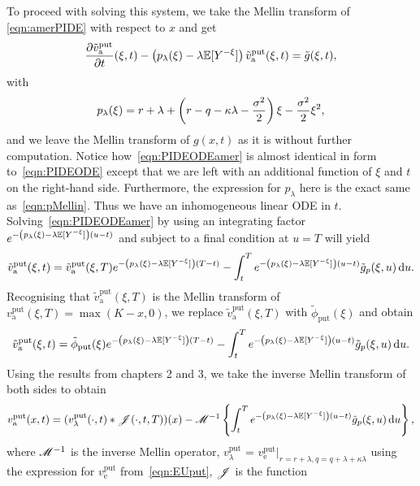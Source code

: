 To proceed with solving this system, we take the Mellin transform of \eqref{eqn:amerPIDE} with respect to $x$ and get
      \begin{equation}
      	  \label{eqn:PIDEODEamer}
        \frac{\partial \tilde{ v}_{\text{a}}^{\text{put}}}{\partial t}(\xi,t) - \left(p_\lambda(\xi) - \lambda\mathbb E[Y^{-\xi}]\right)\tilde{ v}_{\text{a}}^{\text{put}}(\xi,t) = \tilde{g}(\xi,t),
      \end{equation}
    with
      \begin{equation*}
        p_\lambda(\xi) = r + \lambda + \left(r - q -\kappa\lambda - \frac{\sigma^2}{2}\right)\xi - \frac{\sigma^2}{2}\xi^2,
      \end{equation*}
    and we leave the Mellin transform of $g(x,t)$ as it is without further computation. Notice how~\eqref{eqn:PIDEODEamer} is almost identical in form to~\eqref{eqn:PIDEODE} except that we are left with an additional function of $\xi$ and $t$ on the right-hand side. Furthermore, the expression for $p_\lambda$ here is the exact same as~\eqref{eqn:pMellin}. Thus we have an inhomogeneous linear ODE in $t$. Solving~\eqref{eqn:PIDEODEamer} by using an integrating factor $e^{-\left(p_\lambda(\xi) -\lambda\mathbb E[Y^{-\xi}]\right)(u-t)}$ and subject to a final condition at $u=T$ will yield
      $$
        \tilde{v}_{\text{a}}^{\text{put}}(\xi,t) = \tilde{ v}_{\text{a}}^{\text{put}}(\xi,T)e^{-\left(p_\lambda(\xi) -\lambda\mathbb E[Y^{-\xi}]\right)(T-t)} - \int_t^T e^{-\left(p_\lambda(\xi) -\lambda\mathbb E[Y^{-\xi}]\right)(u-t)}\tilde{g}_p(\xi,u) \, \mathrm d u.
      $$
      Recognising that $\tilde{ v}_{\text{a}}^{\text{put}}(\xi,T)$ is the Mellin transform of $v_{\text{a}}^{\text{put}}(\xi,T) = \max(K-x,0)$, we replace $\tilde{ v}_{\text{a}}^{\text{put}}(\xi,T)$ with $\tilde \phi_{\text{put}}(\xi)$ and obtain
       $$
        \tilde{ v}_{\text{a}}^{\text{put}}(\xi,t) = \tilde \phi_{\text{put}}(\xi)e^{-\left(p_\lambda(\xi) -\lambda\mathbb E[Y^{-\xi}]\right)(T-t)} - \int_t^T e^{-\left(p_\lambda(\xi) -\lambda\mathbb E[Y^{-\xi}]\right)(u-t)}\tilde{g}_p(\xi,u) \, \mathrm d u.
      $$
    Using the results from chapters 2 and 3, we take the inverse Mellin transform of both sides to obtain
      $$
       v_{\text{a}}^{\text{put}}(x,t) = (v_\lambda^{\text{put}}(\cdot,t) \ast \mathscr J(\cdot, t, T))(x)
        - \mathscr M^{-1}\left\{ \int_t^T e^{-\left(p_\lambda(\xi) -\lambda\mathbb E[Y^{-\xi}]\right)(u-t)}\tilde{g}_p(\xi,u) \, \mathrm d u \right\},
      $$
    where $\mathscr M^{-1}$ is the inverse Mellin operator, $v_\lambda^{\text{put}}$ = $v_\text{e}^{\text{put}}|_{r=r+\lambda,q=q+\lambda+\kappa\lambda}$ using the expression for $v_\text{e}^{\text{put}}$ from~\eqref{eqn:EUput}, $\mathscr J$ is the function
